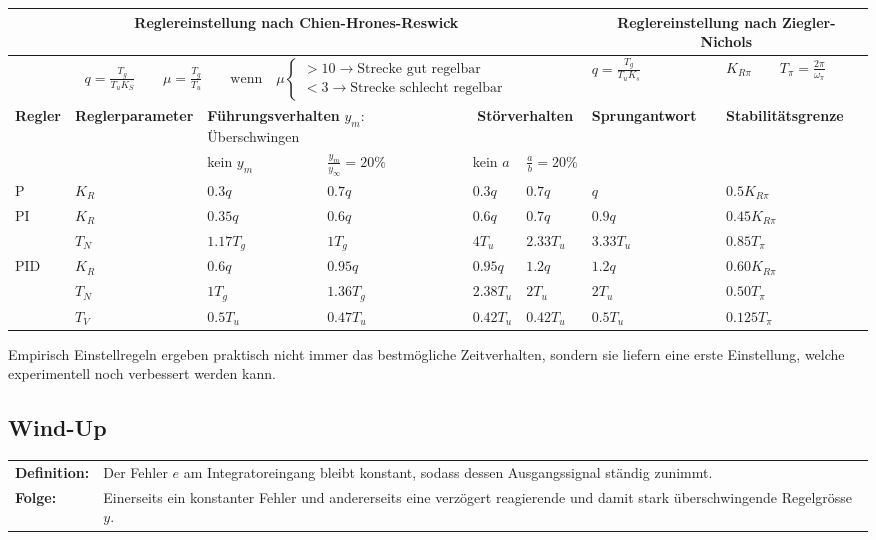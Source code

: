	\begin{tabular}{|l|p{1.8cm}|l|l|l|l||l|l|}
	    \hline
	    \multicolumn{6}{|c||}{
	      \textbf{Reglereinstellung nach Chien-Hrones-Reswick}
	    } &
	    \multicolumn{2}{|c|}{
	      \textbf{Reglereinstellung nach Ziegler-Nichols}
	    }
		\\ \hline
		\multicolumn{6}{|c||}{
		  $
		  q = \frac{T_g}{T_uK_S} \qquad \mu = \frac{T_g}{T_u}
		  \qquad \text{wenn} \quad \mu
		  \begin{cases}
		    > 10 \rightarrow \text{Strecke gut regelbar} \\
		    < 3 \rightarrow \text{Strecke schlecht regelbar}
		  \end{cases}
		  $
		} & $q=\frac{T_g}{T_uK_s}$ & $K_{R\pi} \qquad T_\pi=\frac{2\pi}{\omega_\pi}$
		\\ \hline
		\textbf{Regler} & \textbf{Regler\-parameter} &
		\multicolumn{2}{|p{3.5cm}|}{\textbf{Führungsverhalten} \newline $y_m$:
		Überschwingen} &
		\multicolumn{2}{|c||}{\textbf{Störverhalten}} &
		\textbf{Sprungantwort} & \textbf{Stabilitätsgrenze}
		\\ \hline
		& & kein $y_m$ & $\frac{y_m}{y_\infty} = 20 \%$ & kein $a$ & $\frac{a}{b}= 20 \%$ & &
		\\ \hline
		P 	& $K_R$ 	& $0.3q$ 	& $0.7q$ 	& $0.3q$ 	& $0.7q$	& $q$ 	& $0.5K_{R\pi}$
		\\ \hline
		PI	& $K_R$		& $0.35q$	& $0.6q$	& $0.6q$	& $0.7q$	& $0.9q$ 	& $0.45K_{R\pi}$
		\\
		    & $T_N$		& $1.17T_g$	& $1T_g$	& $4T_u$	& $2.33T_u$ & $3.33T_u$ &
		    $0.85T_{\pi}$ \\ \hline
		PID & $K_R$		& $0.6q$	& $0.95q$	& $0.95q$	& $1.2q$ 	& $1.2q$ 	& $0.60K_{R\pi}$
		\\
			& $T_N$		& $1T_g$	& $1.36T_g$	& $2.38T_u$	& $2T_u$ 	& $2T_u$	& $0.50T_\pi$
		\\
			& $T_V$		& $0.5T_u$	& $0.47T_u$	& $0.42T_u$	& $0.42T_u$ & $0.5T_u$ 	& $0.125T_\pi$
		\\ \hline
	\end{tabular}
  
  Empirisch Einstellregeln ergeben praktisch nicht immer das bestmögliche Zeitverhalten,
  sondern sie liefern eine erste Einstellung, welche experimentell noch verbessert werden kann.


	\subsection{Wind-Up }
  \begin{tabular}{lp{15cm}}
    \textbf{Definition:} &
    Der Fehler $e$ am Integratoreingang bleibt konstant, sodass dessen
    Ausgangssignal ständig zunimmt. \\
    
    \textbf{Folge:} & 
    Einerseits ein konstanter Fehler und andererseits eine verzögert reagierende
    und damit stark überschwingende Regelgrösse $y$.
  \end{tabular}

